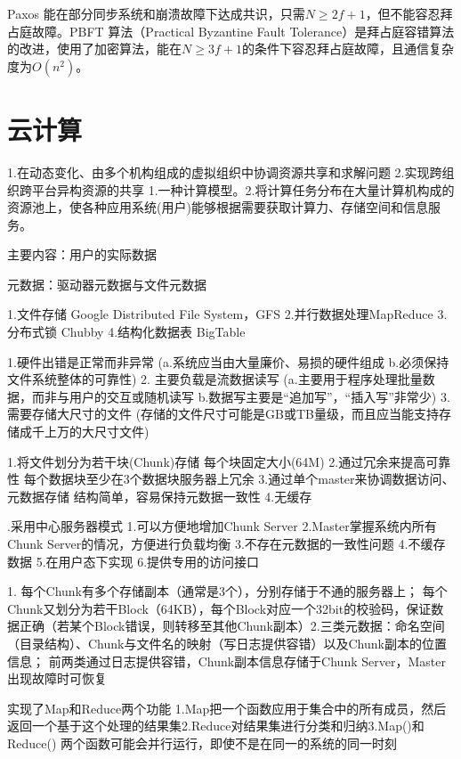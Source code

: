 \documentclass[twoside]{ctexart}
\begin{document}
\begin{multicols}{2}
  Paxos 能在部分同步系统和崩溃故障下达成共识，只需$N≥2f+1$，但不能容忍拜占庭故障。PBFT 算法（Practical Byzantine Fault Tolerance）是拜占庭容错算法的改进，使用了加密算法，能在$N≥3f+1$的条件下容忍拜占庭故障，且通信复杂度为$O(n^2)$。

  \section{云计算}  1.在动态变化、由多个机构组成的虚拟组织中协调资源共享和求解问题 2.实现跨组织跨平台异构资源的共享  1.一种计算模型。2.将计算任务分布在大量计算机构成的资源池上，使各种应用系统(用户)能够根据需要获取计算力、存储空间和信息服务。

  
  主要内容：用户的实际数据
  
  元数据：驱动器元数据与文件元数据
  
   1.文件存储 Google Distributed File System，GFS 2.并行数据处理MapReduce 3.分布式锁 Chubby 4.结构化数据表 BigTable
  
   1.硬件出错是正常而非异常 (a.系统应当由大量廉价、易损的硬件组成 b.必须保持文件系统整体的可靠性) 2. 主要负载是流数据读写 (a.主要用于程序处理批量数据，而非与用户的交互或随机读写 b.数据写主要是``追加写''，``插入写''非常少) 3. 需要存储大尺寸的文件 (存储的文件尺寸可能是GB或TB量级，而且应当能支持存储成千上万的大尺寸文件) 
  
   1.将文件划分为若干块(Chunk)存储 每个块固定大小(64M) 2.通过冗余来提高可靠性 每个数据块至少在3个数据块服务器上冗余 3.通过单个master来协调数据访问、元数据存储 结构简单，容易保持元数据一致性 4.无缓存

   .采用中心服务器模式 1.可以方便地增加Chunk Server 2.Master掌握系统内所有Chunk Server的情况，方便进行负载均衡 3.不存在元数据的一致性问题 4.不缓存数据 5.在用户态下实现 6.提供专用的访问接口 
  
   1. 每个Chunk有多个存储副本（通常是3个），分别存储于不通的服务器上； 每个Chunk又划分为若干Block（64KB），每个Block对应一个32bit的校验码，保证数据正确（若某个Block错误，则转移至其他Chunk副本）2.三类元数据：命名空间（目录结构）、Chunk与文件名的映射（写日志提供容错）以及Chunk副本的位置信息； 前两类通过日志提供容错，Chunk副本信息存储于Chunk Server，Master出现故障时可恢复

   实现了Map和Reduce两个功能 1.Map把一个函数应用于集合中的所有成员，然后返回一个基于这个处理的结果集2.Reduce对结果集进行分类和归纳3.Map()和 Reduce() 两个函数可能会并行运行，即使不是在同一的系统的同一时刻
  

\end{multicols}
\end{document}
